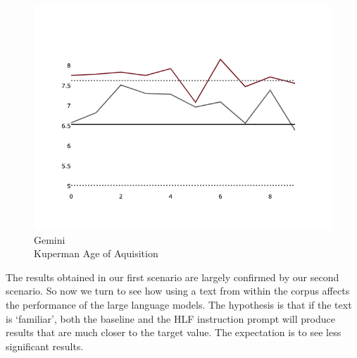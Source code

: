\documentclass[11pt]{article}
\begin{document}
\begin{figure}[hpb]
\begin{minipage}{0.32\textwidth}
        \label{fig-p2-command-r-simpttr}
    \end{minipage}
    \hfill
    \begin{minipage}{0.32\textwidth}
        \includegraphics[width=\linewidth]{plots/prompt_2/prompt_2-gemini-cnn_dailymail/prompt_2-gemini-cnn_dailymail_a_kup_pw.png}
        \caption[center]{Gemini\\Kuperman Age of Aquisition}
        \label{fig-p2-gemini-a-kup-pw}
    \end{minipage}
\end{figure}

The results obtained in our first scenario are largely confirmed by our second
scenario.
So now we turn to see how using a text from within the corpus affects the
performance of the large language models.
The hypothesis is that if the text is `familiar', both the baseline and the HLF
instruction prompt will produce results that are much closer to the target
value.
The expectation is to see less significant results.
\end{document}
